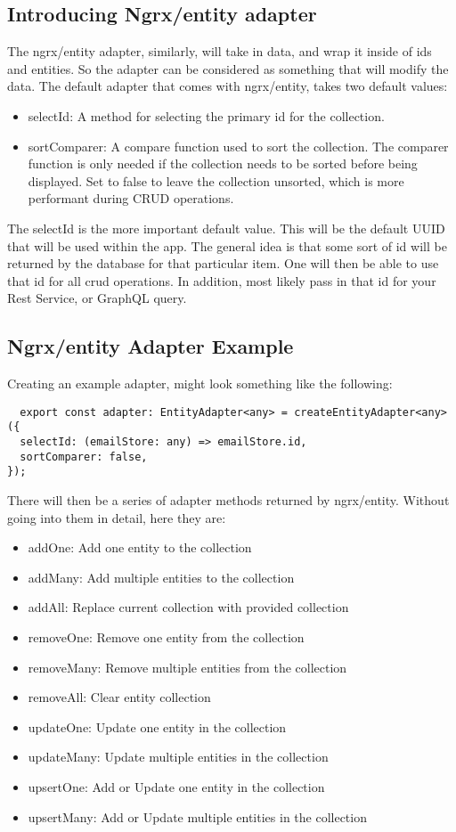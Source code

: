 \subsection{ Introducing Ngrx/entity adapter }
The ngrx/entity adapter, similarly, will take in data, and wrap it inside of ids
and entities. So the adapter can be considered as something that will modify
the data. The default adapter that comes with ngrx/entity, takes two default
values:
\begin{itemize}
  \item selectId: A method for selecting the primary id for the collection.
  \item sortComparer: A compare function used to sort the collection. The
  comparer function is only needed if the collection needs to be sorted before
  being displayed. Set to false to leave the collection unsorted, which is more
  performant during CRUD operations.
\end{itemize}

The selectId is the more important default value. This will be the default UUID
that will be used within the app. The general idea is that some sort of id will
be returned by the database for that particular item. One will then be able to
use that id for all crud operations. In addition, most likely pass in that id
for your Rest Service, or GraphQL query.

\subsection{ Ngrx/entity Adapter Example }
Creating an example adapter, might look something like the following:
\begin{lstlisting}
  export const adapter: EntityAdapter<any> = createEntityAdapter<any>({
  selectId: (emailStore: any) => emailStore.id,
  sortComparer: false,
});
\end{lstlisting}

There will then be a series of adapter methods returned by ngrx/entity. Without
going into them in detail, here they are:
\begin{itemize}
  \item addOne: Add one entity to the collection
  \item addMany: Add multiple entities to the collection
  \item addAll: Replace current collection with provided collection
  \item removeOne: Remove one entity from the collection
  \item removeMany: Remove multiple entities from the collection
  \item removeAll: Clear entity collection
  \item updateOne: Update one entity in the collection
  \item updateMany: Update multiple entities in the collection
  \item upsertOne: Add or Update one entity in the collection
  \item upsertMany: Add or Update multiple entities in the collection
\end{itemize}

